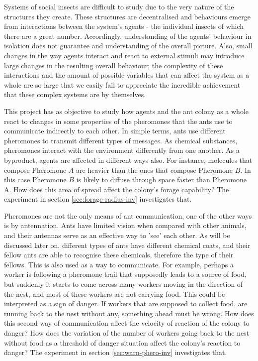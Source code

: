 Systems of social insects are difficult to study due to the very nature of the structures they create. These structures are decentralised and behaviours emerge from interactions between the system's agents - the individual insects of which there are a great number. Accordingly, understanding of the agents' behaviour in isolation does not guarantee and understanding of the overall picture. Also, small changes in the way agents interact and react to external stimuli may introduce large changes in the resulting overall behaviour; the complexity of these interactions and the amount of possible variables that can affect the system as a whole are so large that we easily fail to appreciate the incredible achievement that these complex systems are by themselves.

This project has as objective to study how agents and the ant colony as a whole react to changes in some properties of the pheromones that the ants use to communicate indirectly to each other. In simple terms, ants use different pheromones to transmit different types of messages. As chemical substances, pheromones interact with the environment differently from one another. As a byproduct, agents are affected in different ways also. For instance, molecules that compose Pheromone $A$ are heavier than the ones that compose Pheromone $B$. In this case Pheromone $B$ is likely to diffuse through space faster than Pheromone A. How does this area of spread affect the colony's forage capability? The experiment in section \ref{sec:forage-radius-inv} investigates that. 

Pheromones are not the only means of ant communication, one of the other ways is by antennation. Ants have limited vision when compared with other animals, and their antennas serve as an effective way to 'see' each other. As will be discussed later on, different types of ants have different chemical coats, and their fellow ants are able to recognise these chemicals, therefore the type of their fellows. This is also used as a way to communicate. For example, perhaps a worker is following a pheromone trail that supposedly leads to a source of food, but suddenly it starts to come across many workers moving in the direction of the nest, and most of these workers are not carrying food. This could be interpreted as a sign of danger. If workers that are supposed to collect food, are running back to the nest without any, something ahead must be wrong. How does this second way of communication affect the velocity of reaction of the colony to danger? How does the variation of the number of workers going back to the nest without food as a threshold of danger situation affect the colony's reaction to danger? The experiment in section \ref{sec:warn-phero-inv} investigates that. 

